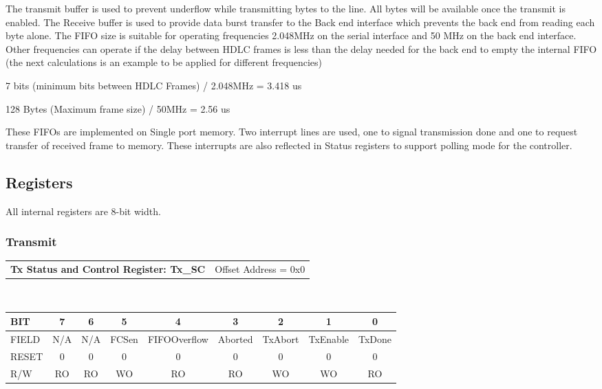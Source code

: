 \documentclass[a4paper,11pt]{article}
\begin{document}
The transmit buffer is used to prevent underflow while transmitting bytes to the line. All bytes will be available once the transmit is enabled. The Receive buffer is used to provide data burst transfer to the Back end interface which prevents the back end from reading each byte alone. The FIFO size is suitable for operating frequencies 2.048MHz on the serial interface and 50 MHz on the back end interface. Other frequencies can operate if the delay between HDLC frames is less than the delay needed for the back end to empty the internal FIFO (the next calculations is an example to be applied for different frequencies)
 
7 bits (minimum bits between HDLC Frames) / 2.048MHz = 3.418 us
 
128 Bytes (Maximum frame size) / 50MHz = 2.56 us
 
 
These FIFOs are implemented on Single port memory. Two interrupt lines are used, one to signal transmission done and one to request transfer of received frame to memory. These interrupts are also reflected in Status registers to support polling mode for the controller.
 
 
 
\subsection{Registers}
All internal registers are 8-bit width.
\subsubsection{Transmit}
 
\begin{tabular}{l l}
\textbf{Tx Status and Control Register: Tx\_SC} & Offset Address = 0x0\\
\end{tabular}\\
 
\begin{tabular}{|l||c|c|c|c|c|c|c|c|}
\hline
\hline
BIT   & 7 & 6 & 5 & 4 & 3 & 2 & 1 & 0\\ 
\hline
FIELD &N/A &N/A &FCSen & FIFOOverflow& Aborted& TxAbort& TxEnable& TxDone\\
\hline
RESET & 0& 0& 0& 0& 0& 0& 0& 0\\
\hline
R/W   & RO& RO& WO&   RO&  RO&   WO&     WO& RO\\
\hline
\end{tabular}\\
 
\end{document}
